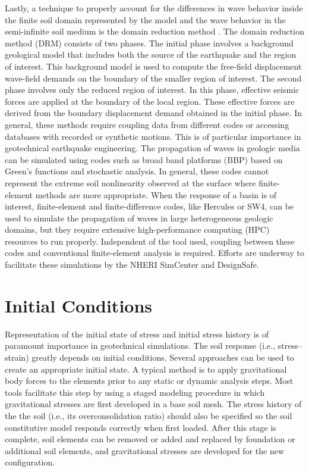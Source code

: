 Lastly, a technique to properly account for the differences in wave behavior inside the finite soil domain represented by the model and the wave behavior in the semi-infinite soil medium is the domain reduction method \citep{Bielak03, Yoshimura03}. The domain reduction method (DRM) consists of two phases. The initial phase involves a background geological model that includes both the source of the earthquake and the region of interest. This background model is used to compute the free-field displacement wave-field demands on the boundary of the smaller region of interest. The second phase involves only the reduced region of interest. In this phase, effective seismic forces are applied at the boundary of the local region. These effective forces are derived from the boundary displacement demand obtained in the initial phase. In general, these methods require coupling data from different codes or accessing databases with recorded or synthetic motions. This is of particular importance in geotechnical earthquake engineering. The propagation of waves in geologic media can be simulated using codes such as broad band platforms (BBP) based on Green's functions and stochastic analysis. In general, these codes cannot represent the extreme soil nonlinearity observed at the surface where finite-element methods are more appropriate. When the response of a basin is of interest, finite-element and finite-difference codes, like Hercules or SW4, can be used to simulate the propagation of waves in large heterogeneous geologic domains, but they require extensive high-performance computing (HPC) resources to run properly. Independent of the tool used, coupling between these codes and conventional finite-element analysis is required. Efforts are underway to facilitate these simulations by the NHERI SimCenter and DesignSafe.

\section{Initial Conditions}
\label{sec:resp_geotech_6}

Representation of the initial state of stress and initial stress history is of paramount importance in geotechnical simulations. The soil response (i.e., stress--strain) greatly depends on initial conditions. Several approaches can be used to create an appropriate initial state. A typical method is to apply gravitational body forces to the elements prior to any static or dynamic analysis steps. Most tools facilitate this step by using a staged modeling procedure in which gravitational stresses are first developed in a base soil mesh. The stress history of the the soil (i.e., its overconsolidation ratio) should also be specified so the soil constitutive model responds correctly when first loaded. After this stage is complete, soil elements can be removed or added and replaced by foundation or additional soil elements, and gravitational stresses are developed for the new configuration.

